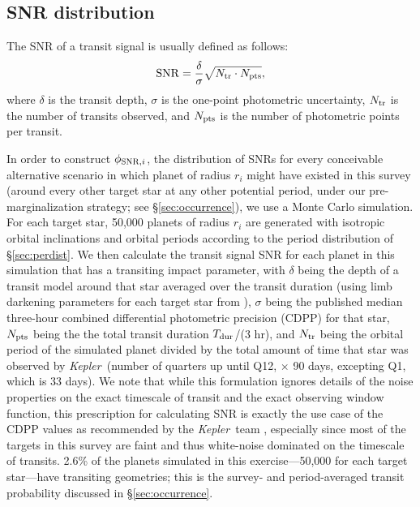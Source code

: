 \documentclass[iop]{emulateapj}
\def\Kepler{\textit{Kepler}}
\begin{document}
\subsection{SNR distribution}
\label{sec:snrdist}




The SNR of a transit signal is usually defined as follows:
\begin{equation}
\label{eq:snr}
{\rm SNR} = \frac{\delta}{\sigma} \sqrt{N_{\rm tr} \cdot N_{\rm pts}},
\end{equation}
where $\delta$ is the transit depth, $\sigma$ is the one-point photometric uncertainty, $N_{\rm tr}$ is the number of transits observed, and $N_{\rm pts}$ is the number of photometric points per transit.   



In order to construct $\phi_{{\rm SNR},i}$, the distribution of SNRs for every conceivable alternative scenario in which planet of radius $r_i$ might have existed in this survey (around every other target star at any other potential period, under our pre-marginalization strategy; see \S\ref{sec:occurrence}), we use a Monte Carlo simulation.  For each target star, 50,000 planets of radius $r_i$ are generated with isotropic orbital inclinations and orbital periods according to the period distribution of \S\ref{sec:perdist}.  We then calculate the transit signal SNR for each planet in this simulation that has a transiting impact parameter, with $\delta$ being the depth of a \citet{ma02} transit model around that star averaged over the transit duration (using limb darkening parameters for each target star from \citet{claret2012}), $\sigma$ being the published median three-hour combined differential photometric precision (CDPP) for that star, $N_{\rm pts}$ being the the total transit duration $T_{\rm dur}$/(3 hr), and $N_{\rm tr}$ being the orbital period of the simulated planet divided by the total amount of time that star was observed by \Kepler\ (number of quarters up until Q12, $\times$ 90 days, excepting Q1, which is 33 days).  We note that while this formulation ignores details of the noise properties on the exact timescale of transit and the exact observing window function, this prescription for calculating SNR is exactly the use case of the CDPP values as recommended by the \Kepler\ team \citep{christiansen2012}, especially since most of the targets in this survey are faint and thus white-noise dominated on the timescale of transits.  2.6\% of the planets simulated in this exercise---50,000 for each target star---have transiting geometries; this is the survey- and period-averaged transit probability discussed in \S\ref{sec:occurrence}.  
\end{document}
